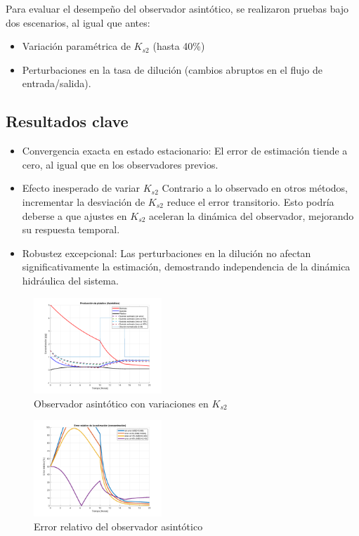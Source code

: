 \documentclass[letterpaper, 10 pt, conference]{ieeeconf}  %
\begin{document}
Para evaluar el desempeño del observador asintótico, se realizaron pruebas bajo dos escenarios, al igual que antes:

\begin{itemize}
  \item{Variación paramétrica de $K_{s2}$ (hasta 40\%)}
  \item{Perturbaciones en la tasa de dilución (cambios abruptos en el flujo de entrada/salida).}
\end{itemize}

\subsection{Resultados clave}

\begin{itemize}
  \item{Convergencia exacta en estado estacionario: El error de estimación tiende a cero, al igual que en los observadores previos.}
  \item{Efecto inesperado de variar $K_{s2}$ Contrario a lo observado en otros métodos, incrementar la desviación de $K_{s2}$ reduce el error transitorio. Esto podría deberse a que ajustes en $K_{s2}$ aceleran la dinámica del observador, mejorando su respuesta temporal.}
  \item{Robustez excepcional: Las perturbaciones en la dilución no afectan significativamente la estimación, demostrando independencia de la dinámica hidráulica del sistema.}
\end{itemize}


\begin{figure}[H]
  \centering
  \includegraphics[width=0.43\textwidth]{./Images_tp2/asintotico.png}
  \caption{Observador asintótico con variaciones en $K_{s2}$}
\end{figure}

\begin{figure}[H]
  \centering
  \includegraphics[width=0.43\textwidth]{./Images_tp2/asintotico_error.png}
  \caption{Error relativo del observador asintótico}
\end{figure}
\end{document}
